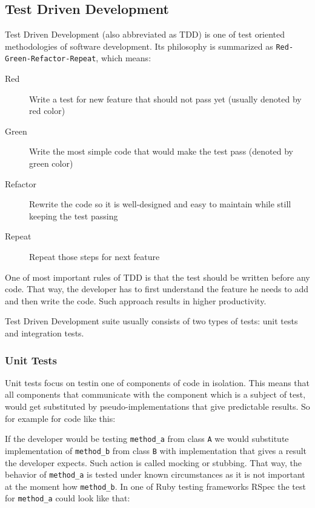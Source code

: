     \subsection{Test Driven Development}
    Test Driven Development (also abbreviated as TDD) is one of test oriented methodologies of software development. Its philosophy is
    summarized as \texttt{Red-Green-Refactor-Repeat}, which means:
      \begin{description}
        \item[Red] Write a test for new feature that should not pass yet (usually denoted by red color)
        \item[Green] Write the most simple code that would make the test pass (denoted by green color)
        \item[Refactor] Rewrite the code so it is well-designed and easy to maintain while still keeping the test passing
        \item[Repeat] Repeat those steps for next feature
      \end{description}
      
      One of most important rules of TDD is that the test should be written before any code. That way, the developer
      has to first understand the feature he needs to add and then write the code. Such approach results in higher
      productivity.
      
      Test Driven Development suite usually consists of two types of tests: unit tests and integration tests.
      
      \subsubsection{Unit Tests}
        Unit tests focus on testin one of components of code in isolation. This means that all components
        that communicate with the component which is a subject of test, would get substituted by pseudo-implementations that give
        predictable results. So for example for code like this:

          

        If the developer would be testing \texttt{method\_a} from class \texttt{A} we would substitute implementation of 
        \texttt{method\_b} from class \texttt{B} with implementation that gives a result the developer expects. Such action
        is called mocking or stubbing. That way, the behavior of \texttt{method\_a} is tested under known circumstances as it is not 
        important at the moment how \texttt{method\_b}. In one of Ruby testing frameworks RSpec the test for \texttt{method\_a} could
        look like that:
      
